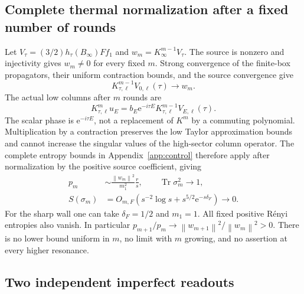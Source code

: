 \documentclass[aps,pra,reprint,superscriptaddress,longbibliography]{revtex4-2}
\newcommand{\Tr}{\operatorname{Tr}}
\newcommand{\ee}{\mathrm e}
\newcommand{\norm}[1]{\left\lVert#1\right\rVert}
\begin{document}
\subsection{Complete thermal normalization after a fixed number of rounds}

Let $V_\tau=(3/2)h_\tau(B_\infty)Ff_1$ and
$w_m=K_\infty^{m-1}V_\tau$. The source is nonzero and injectivity
gives $w_m\ne0$ for every fixed $m$. Strong convergence of the
finite-box propagators, their uniform contraction bounds, and
the source convergence give
\begin{equation}
 K_{\tau,\ell}^{m-1}V_{0,\ell}(\tau)\longrightarrow w_m.
                                                        \label{eq:repeatlimit}
\end{equation}
The actual low columns after $m$ rounds are
\begin{equation}
 K_{\tau,\ell}^m u_E
 =b_E\ee^{-i\tau E}K_{\tau,\ell}^{m-1}V_{E,\ell}(\tau).
                                                        \label{eq:repeatcolumn}
\end{equation}
The scalar phase is $\ee^{-i\tau E}$, not a replacement of
$K^m$ by a commuting polynomial. Multiplication by a contraction
preserves the low Taylor approximation bounds and cannot increase
the singular values of the high-sector column operator. The
complete entropy bounds in Appendix~\ref{app:control} therefore
apply after normalization by the positive source coefficient,
giving
\begin{align}
 p_m&\sim\frac{\norm{w_m}^2}{m_1^2}\frac r s,
 \qquad\Tr\sigma_m^2\to1,\nonumber\\
 S(\sigma_m)&=O_{m,F}(s^{-2}\log s+s^{5/2}\ee^{-s\delta_F})\to0.
                                                        \label{eq:repeatentropy}
\end{align}
For the sharp wall one can take $\delta_F=1/2$ and $m_1=1$.
All fixed positive R\'enyi entropies also vanish. In particular
$p_{m+1}/p_m\to\norm{w_{m+1}}^2/\norm{w_m}^2>0$.
There is no lower bound uniform in $m$, no limit with $m$ growing,
and no assertion at every higher resonance.

\subsection{Two independent imperfect readouts}
\end{document}
